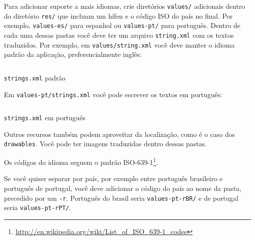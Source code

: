 \documentclass[a4paper,12pt,brazil]{book}
\begin{document}
\begin{singlespace}
	Para adicionar suporte a mais idiomas, crie diretórios \texttt{values/} adicionais dentro do diretório \texttt{res/} que incluam um hífen e o código ISO do país no final. Por exemplo, \texttt{values-es/} para espanhol ou \texttt{values-pt/} para português. Dentro de cada uma dessas pastas você deve ter um arquivo \texttt{string.xml} com os textos traduzidos. Por exemplo, em \texttt{values/string.xml} você deve manter o idioma padrão da aplicação, preferencialmente inglês:

	\begin{listing}[H]
	\inputminted[linenos=true,fontsize=\small,frame=lines, framesep=2mm, tabsize=2,numbersep=5pt]{xml}{src/api/locale/string-en.xml}
	\caption{\texttt{strings.xml} padrão}
	\label{code:locale-strings}
	\end{listing} 	

	Em \texttt{values-pt/strings.xml} você pode escrever os textos em português:

	\begin{listing}[H]
	\inputminted[linenos=true,fontsize=\small,frame=lines, framesep=2mm, tabsize=2,numbersep=5pt]{xml}{src/api/locale/string-pt.xml}
	\caption{\texttt{strings.xml} em português}
	\label{code:locale-strings-pt}
	\end{listing} 	

	Outros recursos também podem aproveitar da localização, como é o caso dos \texttt{drawables}. Você pode ter imagens traduzidas dentro dessas pastas.

	Os códigos do idioma seguem o padrão ISO-639-1\footnote{\href{http://en.wikipedia.org/wiki/List\_of\_ISO\_639-1\_codes}{http://en.wikipedia.org/wiki/List\_of\_ISO\_639-1\_codes}}.

	Se você quiser separar por país, por exemplo entre português brasileiro e português de portugal, você deve adicionar o código do país ao nome da pasta, precedido por um \texttt{-r}. Português do brasil seria \texttt{values-pt-rBR/} e de portugal seria \texttt{values-pt-rPT/}.

	


\end{singlespace}




\singlespace
{}
\clearpage
\thispagestyle{empty}
\doublespace
\end{document}
